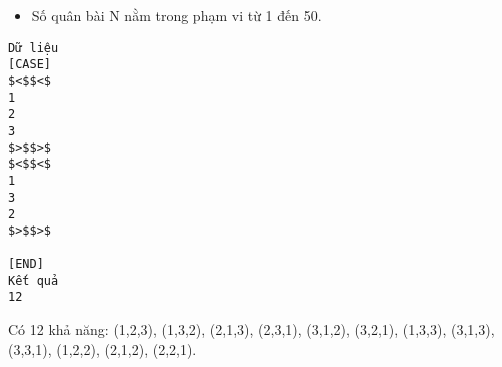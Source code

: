 \begin{itemize}
	\item     Số quân bài N nằm trong phạm vi từ 1 đến 50.   
\end{itemize}
\begin{verbatim}
Dữ liệu
[CASE]
$<$$<$
1
2 
3
$>$$>$
$<$$<$
1 
3
2
$>$$>$

[END]
Kết quả
12
\end{verbatim}
Có 12 khả năng: (1,2,3), (1,3,2), (2,1,3), (2,3,1), (3,1,2), (3,2,1), (1,3,3), (3,1,3), (3,3,1), (1,2,2), (2,1,2), (2,2,1).